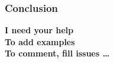 
\begin{frame}
  \frametitle{Conclusion}
  \begin{center}
    \textbf{I need your help} \\[2em]
    \textbf{To add examples} \\[2em]
    \textbf{To comment, fill issues \ldots}
  \end{center}
\end{frame}

